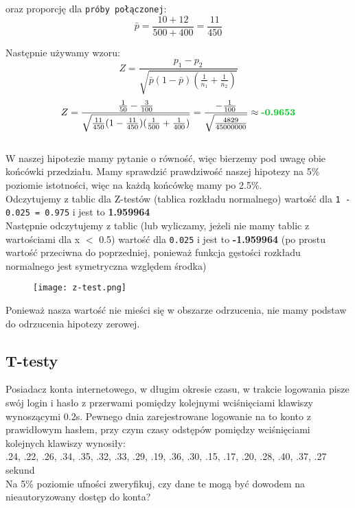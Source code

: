 \documentclass[main.tex]{subfiles}
\begin{document}
    oraz proporcję dla \texttt{próby połączonej}:
    \begin{equation*}
        \bar{p} = \frac{10 + 12}{500 + 400} = \frac{11}{450}
    \end{equation*}

    Następnie używamy wzoru:
    \begin{equation*}
        Z = \frac{p_{1} - p_{2}}{\sqrt{\bar{p}(1-\bar{p})(\frac{1}{n_{1}} + \frac{1}{n_{2}})}}
    \end{equation*}
    \begin{equation*}
        Z = \frac{\frac{1}{50} - \frac{3}{100}}{\sqrt{\frac{11}{450}(1-\frac{11}{450})(\frac{1}{500} + \frac{1}{400})}} = \frac{-\frac{1}{100}}{\sqrt{\frac{4829}{45000000}}} \approx \textbf{\color[HTML]{00ca1f}-0.9653}
    \end{equation*} \\

    W naszej hipotezie mamy pytanie o równość, więc bierzemy pod uwagę obie końcówki przedziału. Mamy sprawdzić prawdziwość naszej hipotezy na 5\% poziomie istotności, więc na każdą końcówkę mamy po 2.5\%. \\

    Odczytujemy z tablic dla Z-testów (tablica rozkładu normalnego) wartość dla \texttt{1 - 0.025 = 0.975} i jest to \textbf{\color[HTML]{b30eff}1.959964} \\

    Następnie odczytujemy z tablic (lub wyliczamy, jeżeli nie mamy tablic z wartościami dla x $<$ 0.5) wartość dla \texttt{0.025} i jest to \textbf{\color[HTML]{b30eff}-1.959964} (po prostu wartość przeciwna do poprzedniej, ponieważ funkcja gęstości rozkładu normalnego jest symetryczna względem środka)

    \begin{figure}[H]
        \center
        \texttt{[image: z-test.png]}
    \end{figure}

    Ponieważ nasza wartość nie mieści się w obszarze odrzucenia, nie mamy podstaw do odrzucenia hipotezy zerowej.


    \subsection{T-testy}
    \begin{exercise}
        Posiadacz konta internetowego, w długim okresie czasu, w trakcie logowania pisze swój login i hasło z przerwami pomiędzy kolejnymi wciśnięciami klawiszy wynoszącymi 0.2s. Pewnego dnia zarejestrowane logowanie na to konto z prawidłowym hasłem, przy czym czasy odstępów pomiędzy wciśnięciami kolejnych klawiszy wynosiły: \\

        .24, .22, .26, .34, .35, .32, .33, .29, .19, .36, .30, .15, .17, .20, .28, .40, .37, .27 sekund \\

        Na 5\% poziomie ufności zweryfikuj, czy dane te mogą być dowodem na nieautoryzowany dostęp do konta?
    \end{exercise}
\end{document}

